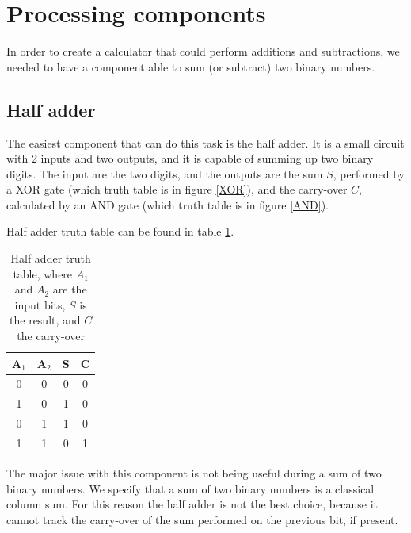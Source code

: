 \documentclass{article}
\begin{document}
\clearpage








\section{Processing components}

In order to create a calculator that could perform additions and subtractions, we needed to have a component able to sum (or subtract) two binary numbers.

\subsection{Half adder}

The easiest component that can do this task is the half adder. It is a small circuit with 2 inputs and two outputs, and it is capable of summing up two binary digits. The input are the two digits, and the outputs are the sum $S$, performed by a XOR gate (which truth table is in figure \ref{XOR}), and the carry-over $C$, calculated by an AND gate (which truth table is in figure \ref{AND}).

\vspace{3mm}

Half adder truth table can be found in table \ref{HalfAdderTT}.

\begin{table}[h]
  \centering
  \begin{tabular}{| c | c || c | c |}
  \hline
  A$_1$ & A$_2$ & S & C \\ \hline
  0 & 0 & 0 & 0 \\ \hline
  1 & 0 & 1 & 0 \\ \hline
  0 & 1 & 1 & 0 \\ \hline
  1 & 1 & 0 & 1 \\ \hline
  \end{tabular}
  \caption{Half adder truth table, where $A_1$ and $A_2$ are the input bits, $S$ is the result, and $C$ the carry-over}
  \label{HalfAdderTT}
\end{table}

The major issue with this component is not being useful during a sum of two binary numbers. We specify that a sum of two binary numbers is a classical column sum. For this reason the half adder is not the best choice, because it cannot track the carry-over of the sum performed on the previous bit, if present.
\end{document}
